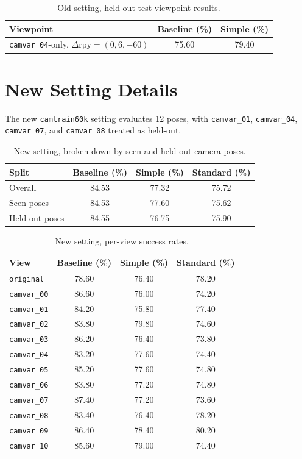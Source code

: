 \documentclass[11pt]{article}
\begin{document}
\begin{table}[h]
\centering
\small
\begin{tabular}{lcc}
\toprule
\textbf{Viewpoint} & \textbf{Baseline (\%)} & \textbf{Simple (\%)} \\
\midrule
\texttt{camvar\_04}-only, \(\Delta \mathrm{rpy}=(0,6,-60)\) & 75.60 & 79.40 \\
\bottomrule
\end{tabular}
\caption{Old setting, held-out test viewpoint results.}
\label{tab:cam_old_heldout}
\end{table}

\section{New Setting Details}
The new \texttt{camtrain60k} setting evaluates 12 poses, with \texttt{camvar\_01}, \texttt{camvar\_04}, \texttt{camvar\_07}, and \texttt{camvar\_08} treated as held-out.

\begin{table}[h]
\centering
\small
\begin{tabular}{lccc}
\toprule
\textbf{Split} & \textbf{Baseline (\%)} & \textbf{Simple (\%)} & \textbf{Standard (\%)} \\
\midrule
Overall & 84.53 & 77.32 & 75.72 \\
Seen poses & 84.53 & 77.60 & 75.62 \\
Held-out poses & 84.55 & 76.75 & 75.90 \\
\bottomrule
\end{tabular}
\caption{New setting, broken down by seen and held-out camera poses.}
\label{tab:cam_current_split}
\end{table}

\begin{table}[p]
\centering
\small
\begin{tabular}{lccc}
\toprule
\textbf{View} & \textbf{Baseline (\%)} & \textbf{Simple (\%)} & \textbf{Standard (\%)} \\
\midrule
\texttt{original} & 78.60 & 76.40 & 78.20 \\
\texttt{camvar\_00} & 86.60 & 76.00 & 74.20 \\
\texttt{camvar\_01} & 84.20 & 75.80 & 77.40 \\
\texttt{camvar\_02} & 83.80 & 79.80 & 74.60 \\
\texttt{camvar\_03} & 86.20 & 76.40 & 73.80 \\
\texttt{camvar\_04} & 83.20 & 77.60 & 74.40 \\
\texttt{camvar\_05} & 85.20 & 77.60 & 74.80 \\
\texttt{camvar\_06} & 83.80 & 77.20 & 74.80 \\
\texttt{camvar\_07} & 87.40 & 77.20 & 73.60 \\
\texttt{camvar\_08} & 83.40 & 76.40 & 78.20 \\
\texttt{camvar\_09} & 86.40 & 78.40 & 80.20 \\
\texttt{camvar\_10} & 85.60 & 79.00 & 74.40 \\
\bottomrule
\end{tabular}
\caption{New setting, per-view success rates.}
\label{tab:cam_current_pose}
\end{table}
\end{document}
